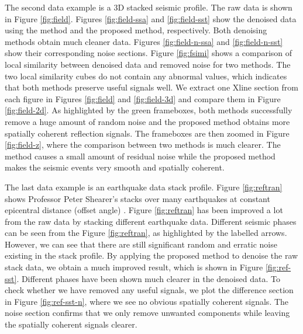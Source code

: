 The second  data example is a 3D stacked seismic profile. The raw data is shown in Figure \ref{fig:field}. Figures \ref{fig:field-ssa} and \ref{fig:field-sst} show the denoised data using the  method and the proposed method, respectively. Both denoising methods obtain much cleaner data. Figures \ref{fig:field-n-ssa} and \ref{fig:field-n-sst} show their corresponding noise sections. Figure \ref{fig:fsimi} shows a comparison of local similarity between denoised data and removed noise for two methods. The two local similarity cubes do not contain any abnormal values, which indicates that both methods preserve useful signals well. We extract one Xline section from each figure in Figures \ref{fig:field} and \ref{fig:field-3d} and compare them in Figure \ref{fig:field-2d}. As highlighted by the green frameboxes, both methods successfully remove a huge amount of random noise and the proposed method obtains more spatially coherent reflection signals. The frameboxes are then zoomed in Figure \ref{fig:field-z}, where the comparison between two methods is much clearer. The  method causes a small amount of residual noise while the proposed method makes the seismic events very smooth and spatially coherent. 

The last  data example is an earthquake data stack profile. Figure \ref{fig:reftran} shows Professor Peter Shearer's stacks over many earthquakes
at constant epicentral distance (offset angle) \cite[]{shearer2,shearer1}. Figure \ref{fig:reftran} has been improved a lot from the raw data by stacking different earthquake data. Different seismic phases can be seen from the Figure \ref{fig:reftran}, as highlighted by the labelled arrows. However, we can see that there are still significant random and erratic noise existing in the stack profile. By applying the proposed method to denoise the raw stack data, we obtain a much improved result, which is shown in Figure \ref{fig:ref-sst}. Different phases have been shown much clearer in the denoised data. To check whether we have removed any useful signals, we plot the difference section in Figure \ref{fig:ref-sst-n}, where we see no obvious spatially coherent signals. The noise section confirms that we only remove unwanted components while leaving the spatially coherent signals clearer. 

